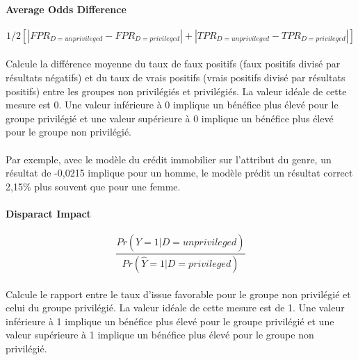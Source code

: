 \documentclass[10pt, french, a4paper]{report}
\begin{document}
\paragraph{Average Odds Difference}

\begin{equation}\label{eq:ave_odds_diff}
  1/2 [|FPR_{D = unprivileged} - FPR_{D = privileged}| + |TPR_{D = unprivileged} - TPR_{D = privileged}|]
\end{equation}

\paragraph{}
Calcule la différence moyenne du taux de faux positifs (faux positifs divisé par résultats négatifs) et du taux de vrais positifs (vrais positifs divisé par résultats positifs) entre les groupes non privilégiés et privilégiés. La valeur idéale de cette mesure est 0. Une valeur inférieure à 0 implique un bénéfice plus élevé pour le groupe privilégié et une valeur supérieure à 0 implique un bénéfice plus élevé pour le groupe non privilégié.

\paragraph{}
Par exemple, avec le modèle du crédit immobilier sur l'attribut du genre, un résultat de -0,0215 implique pour un homme, le modèle prédit un résultat correct 2,15\%  plus souvent que pour une femme.

\paragraph{Disparact Impact}

\begin{equation}\label{eq:disp_impact}
  \frac{Pr(\hat{Y} = 1 | D = unprivileged)}{Pr(\hat{Y} = 1 | D = privileged)}
\end{equation}

\paragraph{}
Calcule le rapport entre le taux d'issue favorable pour le groupe non privilégié et celui du groupe privilégié. La valeur idéale de cette mesure est de 1. Une valeur inférieure à 1 implique un bénéfice plus élevé pour le groupe privilégié et une valeur supérieure à 1 implique un bénéfice plus élevé pour le groupe non privilégié.
\end{document}
